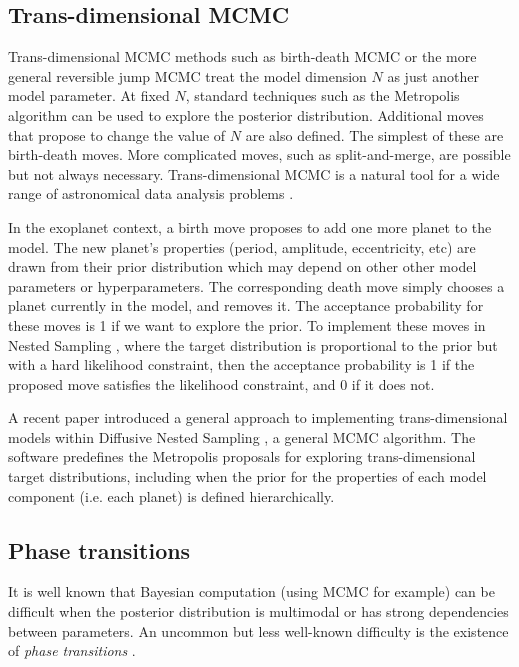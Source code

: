 \documentclass[useAMS,usenatbib]{mn2e}
\begin{document}
\subsection{Trans-dimensional MCMC}
Trans-dimensional MCMC methods such as birth-death MCMC \citep{birthdeath} or the
more general reversible jump MCMC \citep{green} treat the model dimension
$N$ as just another model parameter. At fixed $N$, standard techniques such
as the Metropolis algorithm can be used to explore the posterior distribution.
Additional moves that propose to change the value of $N$ are also defined. The
simplest of these are birth-death moves. More complicated moves, such as
split-and-merge, are possible but not always necessary.
Trans-dimensional MCMC is a natural tool for a wide range of astronomical
data analysis problems \citep[e.g.][]{umstatter, walmswell, starfield, 2014arXiv1411.7447J}.

In the exoplanet context, a birth move
proposes to add one more planet to the model. The new planet's properties
(period, amplitude, eccentricity, etc) are drawn from their prior distribution
which may depend on other other model parameters or hyperparameters.
The corresponding death move simply chooses a planet currently in the model,
and removes it. The acceptance probability for these moves is 1 if we want
to explore the prior. To implement these moves in Nested Sampling
\citep{skilling}, where the target distribution is proportional to the prior but with a hard likelihood
constraint, then the acceptance probability is 1 if the proposed move
satisfies the likelihood constraint, and 0 if it does not.

A recent paper \citep{rjobject} introduced a general approach to implementing
trans-dimensional models within Diffusive Nested Sampling \citep{dnest}, a
general MCMC algorithm. The \citet{rjobject} software predefines the
Metropolis proposals for exploring trans-dimensional target distributions,
including when the prior for the properties of each model component (i.e. each
planet) is defined hierarchically.

\subsection{Phase transitions}
It is well known that Bayesian computation (using MCMC for example) can be
difficult when the posterior distribution is multimodal or has strong
dependencies between parameters. An uncommon but less well-known difficulty
is the existence of {\it phase transitions} \citep{skilling}.
\end{document}

